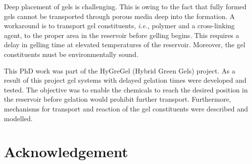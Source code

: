 Deep placement of gels is challenging. This is owing to the fact that fully formed gels cannot be transported through porous media deep into the formation. A workaround is to transport gel constituents, \textit{i.e.}, polymer and a cross-linking agent, to the proper area in the reservoir before gelling begins. This requires a delay in gelling time at elevated temperatures of the reservoir. Moreover, the gel constituents must be environmentally sound.

This PhD work was part of the HyGreGel (Hybrid Green Gels) project. As a result of this project gel systems with delayed gelation times were developed and tested. The objective was to enable the chemicals to reach the desired position in the reservoir before gelation would prohibit further transport. Furthermore, mechanisms for transport and reaction of the gel constituents were described and modelled. 


\clearpage{\thispagestyle{empty}\cleardoublepage}
\chapter*{Acknowledgement}
{\par}


\clearpage{\thispagestyle{empty}\cleardoublepage}

\printnomenclature

